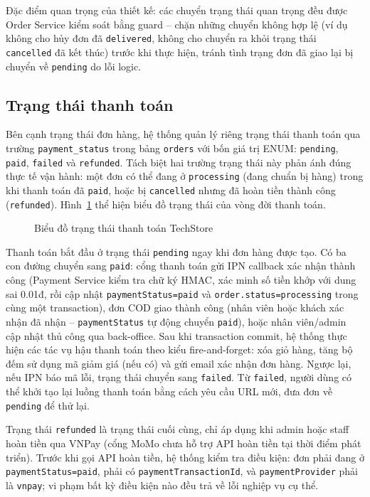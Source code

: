 Đặc điểm quan trọng của thiết kế: các chuyển trạng thái quan trọng đều được Order Service kiểm soát bằng guard -- chặn những chuyển không hợp lệ (ví dụ không cho hủy đơn đã \texttt{delivered}, không cho chuyển ra khỏi trạng thái \texttt{cancelled} đã kết thúc) trước khi thực hiện, tránh tình trạng đơn đã giao lại bị chuyển về \texttt{pending} do lỗi logic.

\subsection{Trạng thái thanh toán}
\label{sec:c3_payment_states}

Bên cạnh trạng thái đơn hàng, hệ thống quản lý riêng trạng thái thanh toán qua trường \texttt{payment\_status} trong bảng \texttt{orders} với bốn giá trị ENUM: \texttt{pending}, \texttt{paid}, \texttt{failed} và \texttt{refunded}. Tách biệt hai trường trạng thái này phản ánh đúng thực tế vận hành: một đơn có thể đang ở \texttt{processing} (đang chuẩn bị hàng) trong khi thanh toán đã \texttt{paid}, hoặc bị \texttt{cancelled} nhưng đã hoàn tiền thành công (\texttt{refunded}). Hình~\ref{fig:payment_states} thể hiện biểu đồ trạng thái của vòng đời thanh toán.

\clearpage
\begin{figure}[H]
  \centering
  \caption{Biểu đồ trạng thái thanh toán TechStore}
  \label{fig:payment_states}
\end{figure}

Thanh toán bắt đầu ở trạng thái \texttt{pending} ngay khi đơn hàng được tạo. Có ba con đường chuyển sang \texttt{paid}: cổng thanh toán gửi IPN callback xác nhận thành công (Payment Service kiểm tra chữ ký HMAC, xác minh số tiền khớp với dung sai 0.01đ, rồi cập nhật \texttt{paymentStatus=paid} và \texttt{order.status=processing} trong cùng một transaction), đơn COD giao thành công (nhân viên hoặc khách xác nhận đã nhận -- \texttt{paymentStatus} tự động chuyển \texttt{paid}), hoặc nhân viên\slash admin cập nhật thủ công qua back-office. Sau khi transaction commit, hệ thống thực hiện các tác vụ hậu thanh toán theo kiểu fire-and-forget: xóa giỏ hàng, tăng bộ đếm sử dụng mã giảm giá (nếu có) và gửi email xác nhận đơn hàng. Ngược lại, nếu IPN báo mã lỗi, trạng thái chuyển sang \texttt{failed}. Từ \texttt{failed}, người dùng có thể khởi tạo lại luồng thanh toán bằng cách yêu cầu URL mới, đưa đơn về \texttt{pending} để thử lại.

Trạng thái \texttt{refunded} là trạng thái cuối cùng, chỉ áp dụng khi admin hoặc staff hoàn tiền qua VNPay (cổng MoMo chưa hỗ trợ API hoàn tiền tại thời điểm phát triển). Trước khi gọi API hoàn tiền, hệ thống kiểm tra điều kiện: đơn phải đang ở \texttt{paymentStatus=paid}, phải có \texttt{paymentTransactionId}, và \texttt{paymentProvider} phải là \texttt{vnpay}; vi phạm bất kỳ điều kiện nào đều trả về lỗi nghiệp vụ cụ thể.

